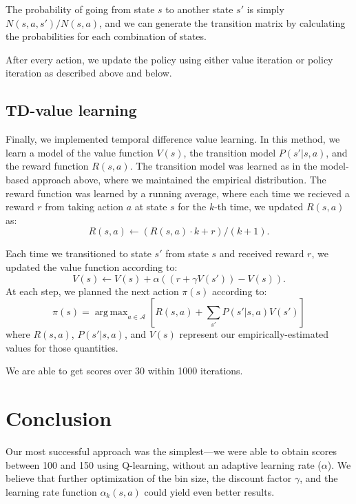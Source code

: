 \documentclass[11pt]{amsart}
\DeclareMathOperator*{\argmax}{arg\,max}
\begin{document}
The probability of going from state $s$ to another state $s'$ is simply $N(s,a,s')/N(s,a)$, and we can generate the transition matrix by calculating the probabilities for each combination of states.

After every action, we update the policy using either value iteration or policy iteration as described above and below.

\subsection{TD-value learning}

Finally, we implemented temporal difference value learning. In this method, we learn a model of the value function $V(s)$, the transition model $P(s'|s,a)$, and the reward function $R(s,a)$. The transition model was learned as in the model-based approach above, where we maintained the empirical distribution. The reward function was learned by a running average, where each time we recieved a reward $r$ from taking action $a$ at state $s$ for the $k$-th time, we updated $R(s,a)$ as:
$$R(s,a) \gets (R(s,a) \cdot k + r)/(k + 1).$$

Each time we transitioned to state $s'$ from state $s$ and received reward $r$, we updated the value function according to:
$$V(s) \gets V(s) + \alpha ((r + \gamma V(s')) - V(s)).$$
At each step, we planned the next action $\pi(s)$ according to:
$$\pi(s) = \argmax_{a \in \mathcal{A}} \left[ R(s,a) + \sum_{s'} P(s'|s,a) V(s') \right]$$
where $R(s,a)$, $P(s'|s,a)$, and $V(s)$ represent our empirically-estimated values for those quantities.

We are able to get scores over 30 within 1000 iterations.

\section{Conclusion}

Our most successful approach was the simplest---we were able to obtain scores between 100 and 150 using Q-learning, without an adaptive learning rate ($\alpha$). We believe that further optimization of the bin size, the discount factor $\gamma$, and the learning rate function $\alpha_k(s,a)$ could yield even better results.
\end{document}
